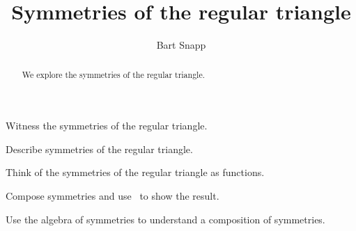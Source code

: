 \documentclass[noauthor,nooutcomes,12pt,hints]{ximera}
\title{Symmetries of the regular triangle}
\author{Bart Snapp}
\begin{document}
\begin{abstract}
  We explore the symmetries of the regular triangle.
\end{abstract}
\maketitle

\begin{listOutcomes}
\item Witness the symmetries of the regular triangle.
\item Describe symmetries of the regular triangle.
\item Think of the symmetries of the regular triangle as functions.
\item Compose symmetries and use \snap\ to show the result.
\item Use the algebra of symmetries to understand a composition of
  symmetries.
\end{listOutcomes}
\mynewpage
\end{document}
